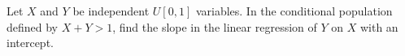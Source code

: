 Let $X$ and $Y$ be independent $U[0,1]$ variables. In the conditional population defined by $X+Y>1$, find the slope in the linear regression of $Y$ on $X$ with an intercept.
